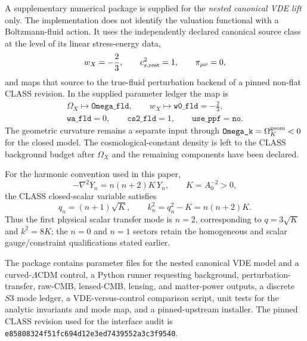 \documentclass[11pt,a4paper]{article}
\def\Sthree{S3}%
\numberwithin{equation}{section}
\theoremstyle{definition}
\theoremstyle{plain}
\theoremstyle{remark}
\newcommand{\Sthree}{S^3}
\begin{document}
A supplementary numerical package is supplied for the \emph{nested canonical
VDE lift} only.  The implementation does not identify the valuation functional
with a Boltzmann-fluid action.  It uses the independently declared canonical
source class at the level of its linear stress-energy data,
\begin{equation}
 w_X=-\frac23,
 \qquad
 c_{s,{\rm rest}}^2=1,
 \qquad
 \pi_{\mu\nu}=0,
\end{equation}
and maps that source to the true-fluid perturbation backend of a pinned
non-flat CLASS revision.  In the supplied parameter ledger the map is
\begin{equation}
\boxed{
\begin{gathered}
\Omega_X\mapsto\texttt{Omega\_fld},\qquad
w_X\mapsto\texttt{w0\_fld}=-\frac23,\\
\texttt{wa\_fld}=0,\qquad
\texttt{cs2\_fld}=1,\qquad
\texttt{use\_ppf}=\texttt{no}.
\end{gathered}}
\end{equation}
The geometric curvature remains a separate input through
\(\texttt{Omega\_k}=\Omega_K^{\rm geom}<0\) for the closed model.  The
cosmological-constant density is left to the CLASS background budget after
\(\Omega_X\) and the remaining components have been declared.

For the harmonic convention used in this paper,
\begin{equation}
 -\nabla^2Y_n=n(n+2)K\,Y_n,
 \qquad K=A_0^{-2}>0,
\end{equation}
the CLASS closed-scalar variable satisfies
\begin{equation}
 q_n=(n+1)\sqrt K,
 \qquad
 k_n^2=q_n^2-K=n(n+2)K.
\end{equation}
Thus the first physical scalar transfer mode is \(n=2\), corresponding to
\(q=3\sqrt K\) and \(k^2=8K\); the \(n=0\) and \(n=1\) sectors retain the
homogeneous and scalar gauge/constraint qualifications stated earlier.

The package contains parameter files for the nested canonical VDE model and a
curved-\(\Lambda\)CDM control, a Python runner requesting background,
perturbation-transfer, raw-CMB, lensed-CMB, lensing, and matter-power outputs,
a discrete \(\Sthree\) mode ledger, a VDE-versus-control comparison script,
unit tests for the analytic invariants and mode map, and a pinned-upstream
installer.  The pinned CLASS revision used for the interface audit is
\texttt{e85808324f51fc694d12e3ed7439552a3c3f9540}.
\end{document}
